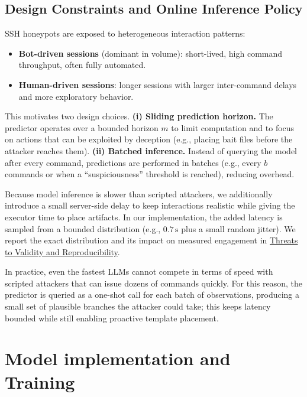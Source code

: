 \documentclass[10pt,a4paper,twocolumn]{article}
\begin{document}
\subsection{Design Constraints and Online Inference Policy}
SSH honeypots are exposed to heterogeneous interaction patterns:
\begin{itemize}
    \item \textbf{Bot-driven sessions} (dominant in volume): short-lived, high command throughput, often fully automated.
    \item \textbf{Human-driven sessions}: longer sessions with larger inter-command delays and more exploratory behavior.
\end{itemize}
This motivates two design choices.
\textbf{(i) Sliding prediction horizon.} The predictor operates over a bounded horizon $m$ to limit computation and to focus on actions that can be exploited by deception (e.g., placing bait files before the attacker reaches them).
\textbf{(ii) Batched inference.} Instead of querying the model after every command, predictions are performed in batches (e.g., every $b$ commands or when a ``suspiciousness'' threshold is reached), reducing overhead.

Because model inference is slower than scripted attackers, we additionally introduce a small server-side delay to keep interactions realistic while giving the executor time to place artifacts. In our implementation, the added latency is sampled from a bounded distribution (e.g., $0.7\,\mathrm{s}$ plus a small random jitter). We report the exact distribution and its impact on measured engagement in \hyperref[sec:threats-validity]{Threats to Validity and Reproducibility}.

In practice, even the fastest LLMs cannot compete in terms of speed with scripted attackers that can issue dozens of commands quickly. For this reason, the predictor is queried as a one-shot call for each batch of observations, producing a small set of plausible branches the attacker could take; this keeps latency bounded while still enabling proactive template placement.




\section{Model implementation and Training}
\label{sec:model-impl-training}
\end{document}
